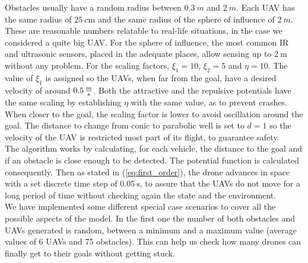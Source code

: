 \documentclass[journal]{IEEEtran}
\newcommand*{\subb}[1]{_{\mathrm{#1}}}
\begin{document}
	Obstacles usually have a random radius between $\SI{0.3}{m}$ and $\SI{2}{m}$. Each UAV has the same radius of $\SI{25}{\centi\meter}$ and the same radius of the sphere of influence of $\SI{2}{m}$. These are reasonable numbers relatable to real-life situations, in the case we considered a quite big UAV. For the sphere of influence, the most common IR and ultrasonic sensors, placed in the adequate places, allow sensing up to $\SI{2}{\meter}$ without any problem. For the scaling factors, $\xi\subb{1} = 10$, $\xi\subb{2} = 5$ and $\eta = 10$. The value of $\xi\subb{1}$ is assigned so the UAVs, when far from the goal, have a desired velocity of around $\SI{0.5}{\frac{\meter}{\second}}$. Both the attractive and the repulsive potentials have the same scaling by establishing $\eta$ with the same value, as to prevent crashes. When closer to the goal, the scaling factor is lower to avoid oscillation around the goal. The distance to change from conic to parabolic well is set to $d = 1$ so the velocity of the UAV is restricted most part of its flight, to guarantee safety.\\
	
	The algorithm works by calculating, for each vehicle, the distance to the goal and if an obstacle is close enough to be detected. The potential function is calculated consequently. Then as stated in (\ref{eq:first_order}), the drone advances in space with a set discrete time step of $\SI{0.05}{\second}$, to assure that the UAVs do not move for a long period of time without checking again the state and the environment.\\
	
	We have implemented some different special case scenarios to cover all the possible aspects of the model. In the first one the number of both obstacles and UAVs generated is random, between a minimum and a maximum value (average values of 6 UAVs and 75 obstacles). This can help us check how many drones can finally get to their goals without getting stuck.
	
\end{document}
